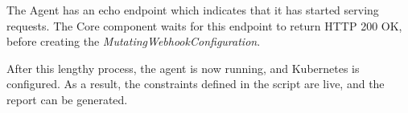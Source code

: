 The Agent has an echo endpoint which indicates that it has started serving requests. The Core component waits for this endpoint to return HTTP 200 OK, before creating the \emph{MutatingWebhookConfiguration}.

After this lengthy process, the agent is now running, and Kubernetes is configured. As a result, the constraints defined in the script are live, and the report can be generated.
